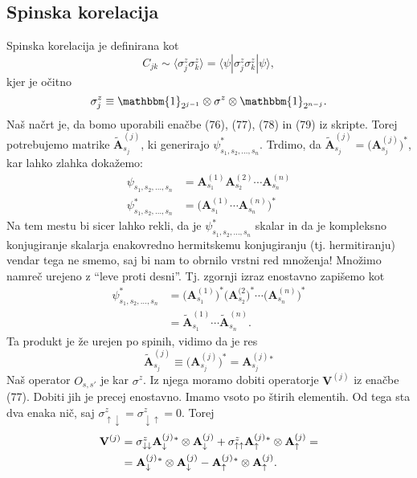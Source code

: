 \documentclass[12pt, a4 paper]{article}
\begin{document}
\subsection{Spinska korelacija}
Spinska korelacija je definirana kot
\[
	C_{jk} \sim \langle \sigma_j^z \sigma_k^z \rangle = \langle \psi| \sigma_j^z \sigma_k^z |\psi \rangle,
\]
kjer je o\v citno
\[
	\sigma_j^z \equiv \mathbbm{1}_{2^{j-1}} \otimes \sigma^z \otimes \mathbbm{1}_{2^{n-j}}.
\]
Na\v s na\v crt je, da bomo uporabili ena\v cbe (76), (77), (78) in (79) iz skripte. Torej potrebujemo matrike
$\tilde{\mathbf{A}}^{(j)}_{s_j}$, ki generirajo $\psi^*_{s_1,s_2,\ldots,s_n}$. Trdimo, da $\tilde{\mathbf{A}}^{(j)}_{s_j} =
\big(\mathbf{A}^{(j)}_{s_j}\big)^*$, kar lahko zlahka doka\v zemo:
\begin{align*}
	\psi_{s_1,s_2,\ldots,s_n} &= \mathbf{A}^{(1)}_{s_1} \mathbf{A}^{(2)}_{s_2} \cdots \mathbf{A}^{(n)}_{s_n} \\
	\psi^*_{s_1,s_2,\ldots,s_n} &= \Big(\mathbf{A}^{(1)}_{s_1} \cdots \mathbf{A}^{(n)}_{s_n}\Big)^*
\end{align*}
Na tem mestu bi sicer lahko rekli, da je $\psi^*_{s_1,s_2,\ldots,s_n}$ skalar in da je kompleksno konjugiranje skalarja
enakovredno hermitskemu konjugiranju (tj. hermitiranju) vendar tega ne smemo, saj bi nam to obrnilo vrstni red mno\v zenja!
Mno\v zimo namre\v c urejeno z "`leve proti desni"'. Tj. zgornji izraz enostavno zapi\v semo kot
\begin{align*}
	\psi^*_{s_1,s_2,\ldots,s_n} &= \big(\mathbf{A}^{(1)}_{s_1}\big)^* \big(\mathbf{A}^{(2}_{s_2}\big)^* \cdots
		\big(\mathbf{A}^{(n)}_{s_n}\big)^* \\
		&= \tilde{\mathbf{A}}^{(1)}_{s_1} \cdots \tilde{\mathbf{A}}^{(n)}_{s_n}.
\end{align*}
Ta produkt je \v ze urejen po spinih, vidimo da je res
\[
	\tilde{\mathbf{A}}^{(j)}_{s_j} \equiv \big(\mathbf{A}^{(j)}_{s_j}\big)^* = \mathbf{A}^{(j)}_{s_j}{}^*
\]
Na\v s operator $O_{s,s'}$ je kar $\sigma^z$. Iz njega moramo dobiti operatorje $\mathbf{V}^{(j)}$ iz ena\v cbe (77). Dobiti
jih je precej enostavno. Imamo vsoto po \v stirih elementih. Od tega sta dva enaka ni\v c, saj $\sigma^z_{\uparrow\downarrow}
= \sigma^z_{\downarrow\uparrow} = 0$. Torej
\begin{align}
	\mathbf{V}^{(j)} &= \sigma^z_{\downarrow\downarrow} \mathbf{A}^{(j)}_{\downarrow}{}^* \otimes
		\mathbf{A}^{(j)}_{\downarrow} + \sigma^z_{\uparrow\uparrow} \mathbf{A}^{(j)}_{\uparrow}{}^*
		\otimes \mathbf{A}^{(j)}_{\uparrow} = \notag \\
		&= \mathbf{A}^{(j)}_{\downarrow}{}^* \otimes \mathbf{A}^{(j)}_{\downarrow} - \mathbf{A}^{(j)}_\uparrow{}^*
		\otimes \mathbf{A}^{(j)}_\uparrow.
\end{align}
\end{document}

